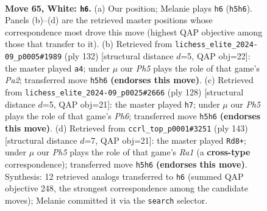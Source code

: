 \documentclass[11pt]{article}
\begin{document}
\clearpage

\begin{figure}[p]\centering
\begin{subfigure}{0.46\textwidth}\centering
\resizebox{\linewidth}{!}{%
\newchessgame
\chessboard[
  setfen={8/8/6R1/7P/8/8/3k1K2/4N3 w - - 2 65},
  showmover=false,
  pgfstyle=straightmove, color=movearrow, markmove={h5-h6}
]}
\caption{}
\end{subfigure}\hfill
\begin{subfigure}{0.46\textwidth}\centering
\resizebox{\linewidth}{!}{%
\newchessgame
\chessboard[
  setfen={8/8/2k5/1N6/2K5/8/P7/8 w - - 3 67},
  showmover=false,
  pgfstyle=straightmove, color=movearrow, markmove={a2-a4}
]}
\caption{}
\end{subfigure}
\\[4pt]
\begin{subfigure}{0.46\textwidth}\centering
\resizebox{\linewidth}{!}{%
\newchessgame
\chessboard[
  setfen={8/8/7P/4K3/5N2/4k3/8/8 w - - 1 65},
  showmover=false,
  pgfstyle=straightmove, color=movearrow, markmove={h6-h7}
]}
\caption{}
\end{subfigure}\hfill
\begin{subfigure}{0.46\textwidth}\centering
\resizebox{\linewidth}{!}{%
\newchessgame
\chessboard[
  setfen={r7/8/8/4k3/4n3/3K4/7R/3B4 b - - 10 72},
  showmover=false,
  pgfstyle=straightmove, color=movearrow, markmove={a8-d8}
]}
\caption{}
\end{subfigure}
\caption{\textbf{Move 65, White: \texttt{h6}.} (a) Our position; Melanie plays \texttt{h6} (\texttt{h5h6}). Panels (b)--(d) are the retrieved master positions whose correspondence most drove this move (highest QAP objective among those that transfer to it). (b) Retrieved from \texttt{lichess\_elite\_2024-09\_p0005\#1989} (ply 132) [structural distance $d$=5, QAP obj=22]: the master played \texttt{a4}; under $\mu$ our \emph{Ph5} plays the role of that game's \emph{Pa2}; transferred move \texttt{h5h6} \textbf{(endorses this move)}. (c) Retrieved from \texttt{lichess\_elite\_2024-09\_p0025\#2666} (ply 128) [structural distance $d$=5, QAP obj=21]: the master played \texttt{h7}; under $\mu$ our \emph{Ph5} plays the role of that game's \emph{Ph6}; transferred move \texttt{h5h6} \textbf{(endorses this move)}. (d) Retrieved from \texttt{ccrl\_top\_p0001\#3251} (ply 143) [structural distance $d$=7, QAP obj=21]: the master played \texttt{Rd8+}; under $\mu$ our \emph{Ph5} plays the role of that game's \emph{Ra1} (a \textbf{cross-type} correspondence); transferred move \texttt{h5h6} \textbf{(endorses this move)}. Synthesis: 12 retrieved analogs transferred to \texttt{h6} (summed QAP objective 248, the strongest correspondence among the candidate moves); Melanie committed it via the \texttt{search} selector.}
\label{fig:thought-m128}
\end{figure}
\end{document}

